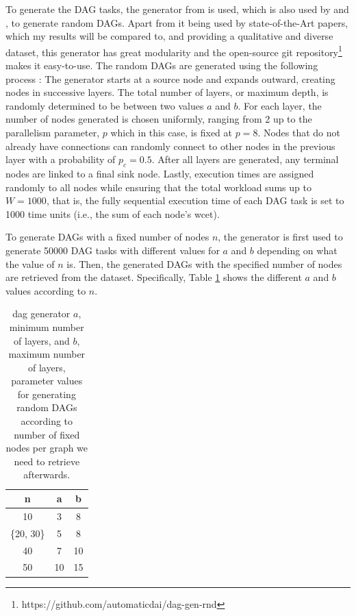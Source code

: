 To generate the DAG tasks, the generator from \citet{zhao2020DAGsched} is used, which is also used by 
\citet{Lee2021GlobalDagSchedDRL} and \citet{Zhao2022DAGsched}, to generate
random DAGs.
Apart from it being used by state-of-the-Art papers, which my results will be compared to,
and providing a qualitative and diverse dataset,
this generator has great modularity and the open-source git repository\footnote{https://github.com/automaticdai/dag-gen-rnd} 
makes it easy-to-use.
The random DAGs are generated using the following process :
The generator starts at a source node and expands outward, 
creating nodes in successive layers. The total number of layers, 
or maximum depth, is randomly determined to be between two values $a$ and $b$.
For each layer, the number of nodes generated is chosen uniformly, 
ranging from 2 up to the parallelism parameter, $p$ which in this case, 
is fixed at $p=8$. Nodes that do 
not already have connections can randomly connect to other nodes in 
the previous layer with a probability of $p_c=0.5$. After all layers 
are generated, any terminal nodes are linked to a final sink node.
Lastly, 
execution times are assigned randomly to all nodes while ensuring 
that the total workload sums up to $W = 1000$\cite{zhao2020DAGsched},
that is, the fully sequential execution time of each DAG task is set to 1000 time units (i.e., the sum of each node's wcet).

To generate DAGs with a fixed number of nodes $n$, 
the generator is first used to generate 50000 DAG tasks
with different values for $a$ and $b$ depending on what 
the value of $n$ is. Then, the generated DAGs with 
the specified number of nodes are retrieved from the dataset.
Specifically, Table \ref{tab:layer_num_minmax} 
shows the different $a$ and $b$ values according to $n$.

\begin{table}
    \centering
    \begin{tabular}{|c|c|c|}    
        \hline
        \textbf{n} & \textbf{a} & \textbf{b} \\
        \hline
        10 & 3 & 8 \\
        \hline
        \{20, 30\} & 5 & 8 \\
        \hline
        40 & 7 & 10 \\
        \hline
        50 & 10 & 15 \\
        \hline
    \end{tabular}
    \caption{dag generator $a$, minimum number of layers, and $b$, maximum
    number of layers, parameter values for generating 
    random DAGs according to number of fixed nodes per graph we need to retrieve afterwards.}
    \label{tab:layer_num_minmax}
\end{table}

